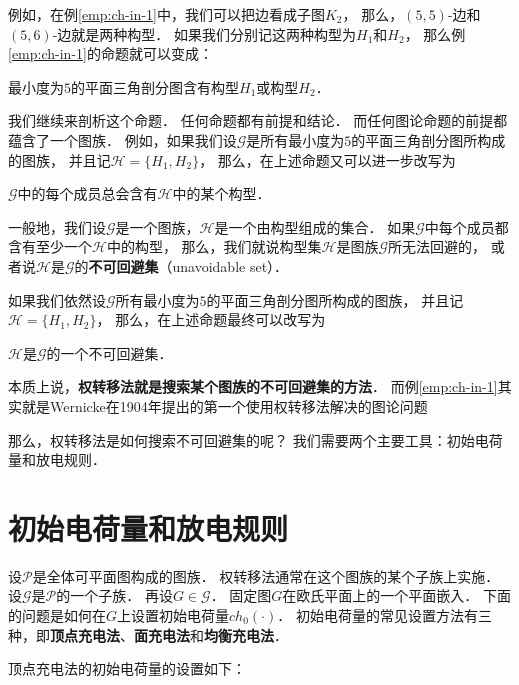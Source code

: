 \documentclass[cn,fancy,blue,11pt]{elegantbook}
\begin{document}
例如，在例\ref{emp:ch-in-1}中，我们可以把边看成子图$K_2$，
那么，$(5,5)$-边和$(5,6)$-边就是两种构型．
如果我们分别记这两种构型为$H_1$和$H_2$，
那么例\ref{emp:ch-in-1}的命题就可以变成：

\begin{framed}
	最小度为$5$的平面三角剖分图含有构型$H_1$或构型$H_2$．
\end{framed}

我们继续来剖析这个命题．
任何命题都有前提和结论．
而任何图论命题的前提都蕴含了一个图族．
例如，如果我们设$\mathcal{G}$是所有最小度为$5$的平面三角剖分图所构成的图族，
并且记$\mathcal{H}=\{H_1,H_2\}$，
那么，在上述命题又可以进一步改写为

\begin{framed}
	$\mathcal{G}$中的每个成员总会含有$\mathcal{H}$中的某个构型．
\end{framed}

一般地，我们设$\mathcal{G}$是一个图族，$\mathcal{H}$是一个由构型组成的集合．
如果$\mathcal{G}$中每个成员都含有至少一个$\mathcal{H}$中的构型，
那么，我们就说构型集$\mathcal{H}$是图族$\mathcal{G}$所无法回避的，
或者说$\mathcal{H}$是$\mathcal{G}$的\textbf{不可回避集}（unavoidable set）．

如果我们依然设$\mathcal{G}$所有最小度为$5$的平面三角剖分图所构成的图族，
并且记$\mathcal{H}=\{H_1,H_2\}$，
那么，在上述命题最终可以改写为

\begin{framed}
	$\mathcal{H}$是$\mathcal{G}$的一个不可回避集．
\end{framed}

本质上说，\textbf{权转移法就是搜索某个图族的不可回避集的方法}．
而例\ref{emp:ch-in-1}其实就是Wernicke在1904年提出的第一个使用权转移法解决的图论问题

那么，权转移法是如何搜索不可回避集的呢？
我们需要两个主要工具：初始电荷量和放电规则．

\section{初始电荷量和放电规则}

设$\mathcal{P}$是全体可平面图构成的图族．
权转移法通常在这个图族的某个子族上实施．
设$\mathcal{G}$是$\mathcal{P}$的一个子族．
再设$G\in \mathcal{G}$．
固定图$G$在欧氏平面上的一个平面嵌入．
下面的问题是如何在$G$上设置初始电荷量$ch_0(\cdot)$．
初始电荷量的常见设置方法有三种，即\textbf{顶点充电法}、\textbf{面充电法}和\textbf{均衡充电法}．

顶点充电法的初始电荷量的设置如下：
\end{document}
